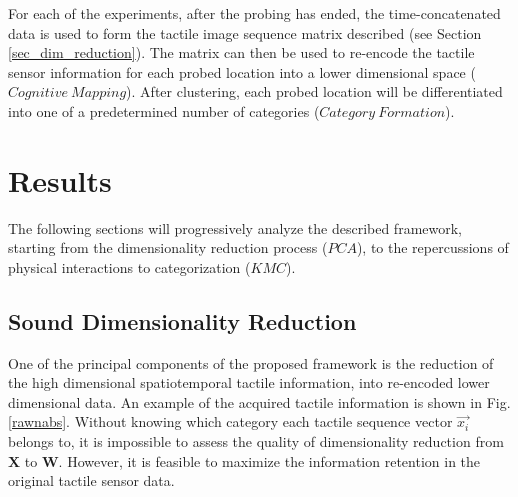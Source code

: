 For each of the experiments, after the probing has ended, the time-concatenated data is used to form the tactile 
image sequence matrix described (see Section \ref{sec_dim_reduction}). The matrix can then be used to re-encode the
tactile sensor information for each probed location into a lower dimensional space ($Cognitive\ Mapping$). After clustering, each probed location will be differentiated into one of a predetermined number of categories ($Category\ Formation$).


\section{Results} \label{sec_results}
The following sections will progressively analyze the described framework, starting from the dimensionality reduction
process ($PCA$), to the repercussions of physical interactions to categorization ($KMC$).


\subsection{Sound Dimensionality Reduction}

One of the principal components of the proposed framework is the reduction of the high dimensional 
spatiotemporal tactile information, into re-encoded lower dimensional data. An example of the 
acquired tactile information is shown in Fig. \ref{rawnabs}.
Without knowing which category each tactile sequence vector $\vec{x_i}$ belongs to, it is impossible to assess
the quality of dimensionality reduction from $\mathbf{X}$ to $\mathbf{W}$. However, it is feasible to maximize the
information retention in the original tactile sensor data.

